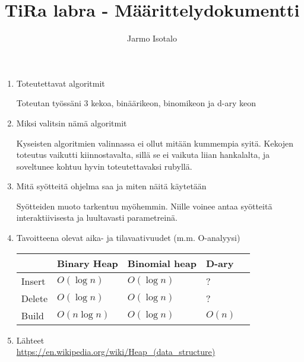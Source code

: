 \documentclass[a4paper,12pt]{article}
\begin{document}
\title{TiRa labra - Määrittelydokumentti} 
\author{Jarmo Isotalo}
\maketitle
\begin{enumerate}
\item Toteutettavat algoritmit

Toteutan työssäni 3 kekoa, binäärikeon, binomikeon ja d-ary keon

\item Miksi valitsin nämä algoritmit

Kyseisten algoritmien valinnassa ei ollut mitään kummempia syitä. Kekojen toteutus vaikutti
kiinnostavalta, sillä se ei vaikuta liian hankalalta, ja soveltunee kohtuu hyvin toteutettavaksi rubyllä.

\item Mitä syötteitä ohjelma saa ja miten näitä käytetään

Syötteiden muoto tarkentuu myöhemmin. 
Niille voinee antaa syötteitä interaktiivisesta ja luultavasti parametreinä.

\item Tavoitteena olevat aika- ja tilavaativuudet (m.m. O-analyysi)

\begin{tabular}{|l|l|l|l|l|}
\hline
&Binary Heap & Binomial heap & D-ary \\\hline
Insert & $O (\log n)$ & $O (\log n)$ & ?\\\hline
Delete  & $O (\log n)$ & $O (\log n)$ & ?\\\hline
Build & $O (n \log n)$ & $O (\log n)$ & $O (n)$\\\hline
\end{tabular}

\item Lähteet\\
\url{https://en.wikipedia.org/wiki/Heap_(data_structure)}
\end{enumerate}
\end{document}
